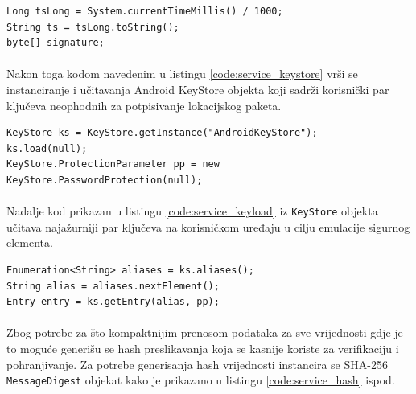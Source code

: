 \begin{code}
\begin{verbatim}
Long tsLong = System.currentTimeMillis() / 1000;
String ts = tsLong.toString();
byte[] signature;
\end{verbatim}
\label{code:service_datetime}
\end{code}

\paragraph*{}
Nakon toga kodom navedenim u listingu \ref{code:service_keystore} vrši se instanciranje i učitavanja Android KeyStore objekta koji sadrži korisnički par ključeva neophodnih za potpisivanje lokacijskog paketa.

\begin{code}
\begin{verbatim}
KeyStore ks = KeyStore.getInstance("AndroidKeyStore");
ks.load(null);
KeyStore.ProtectionParameter pp = new KeyStore.PasswordProtection(null);
\end{verbatim}
\label{code:service_keystore}
\end{code}

\paragraph*{}
Nadalje kod prikazan u listingu \ref{code:service_keyload} iz \texttt{KeyStore} objekta učitava najažurniji par ključeva na korisničkom uređaju u cilju emulacije sigurnog elementa.

\begin{code}
\begin{verbatim}
Enumeration<String> aliases = ks.aliases();
String alias = aliases.nextElement();
Entry entry = ks.getEntry(alias, pp);
\end{verbatim}
\label{code:service_keyload}
\end{code}

\paragraph*{}
Zbog potrebe za što kompaktnijim prenosom podataka za sve vrijednosti gdje je to moguće generišu se hash preslikavanja koja se kasnije koriste za verifikaciju i pohranjivanje. Za potrebe generisanja hash vrijednosti instancira se SHA-256 \texttt{MessageDigest} objekat kako je prikazano u listingu \ref{code:service_hash} ispod.

